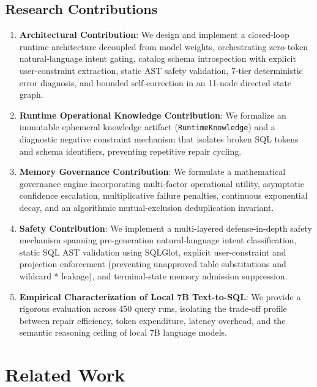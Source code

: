 \documentclass[conference]{IEEEtran}
\begin{document}
\subsection{Research Contributions}
\begin{enumerate}
    \item \textbf{Architectural Contribution}: We design and implement a closed-loop runtime architecture decoupled from model weights, orchestrating zero-token natural-language intent gating, catalog schema introspection with explicit user-constraint extraction, static AST safety validation, 7-tier deterministic error diagnosis, and bounded self-correction in an 11-node directed state graph.
    \item \textbf{Runtime Operational Knowledge Contribution}: We formalize an immutable ephemeral knowledge artifact (\texttt{RuntimeKnowledge}) and a diagnostic negative constraint mechanism that isolates broken SQL tokens and schema identifiers, preventing repetitive repair cycling.
    \item \textbf{Memory Governance Contribution}: We formulate a mathematical governance engine incorporating multi-factor operational utility, asymptotic confidence escalation, multiplicative failure penalties, continuous exponential decay, and an algorithmic mutual-exclusion deduplication invariant.
    \item \textbf{Safety Contribution}: We implement a multi-layered defense-in-depth safety mechanism spanning pre-generation natural-language intent classification, static SQL AST validation using SQLGlot, explicit user-constraint and projection enforcement (preventing unapproved table substitutions and wildcard * leakage), and terminal-state memory admission suppression.
    \item \textbf{Empirical Characterization of Local 7B Text-to-SQL}: We provide a rigorous evaluation across 450 query runs, isolating the trade-off profile between repair efficiency, token expenditure, latency overhead, and the semantic reasoning ceiling of local 7B language models.
\end{enumerate}

\section{Related Work}
\end{document}
